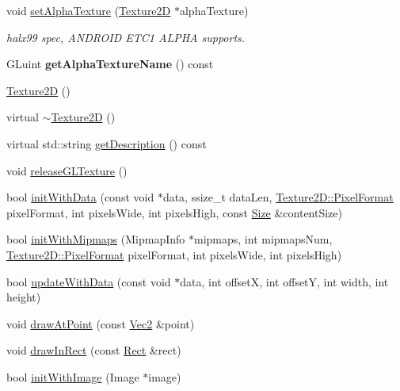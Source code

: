 \begin{DoxyCompactItemize}
void \hyperlink{classTexture2D_a40d47bff7f05c1ef11a7a6a40ad0578c}{set\+Alpha\+Texture} (\hyperlink{classTexture2D}{Texture2D} $\ast$alpha\+Texture)
\begin{DoxyCompactList}\small\item\em halx99 spec, A\+N\+D\+R\+O\+ID E\+T\+C1 A\+L\+P\+HA supports. \end{DoxyCompactList}\item 
\mbox{\label{classTexture2D_adccfd52496163de8b3e62e7ed041ae60}} 
G\+Luint {\bfseries get\+Alpha\+Texture\+Name} () const
\item 
\hyperlink{classTexture2D_ab62c7c5172a4800b4629cd475147819d}{Texture2D} ()
\item 
virtual \hyperlink{classTexture2D_a7871eee8e1b6621b4fb15cc767778459}{$\sim$\+Texture2D} ()
\item 
virtual std\+::string \hyperlink{classTexture2D_aa2c1fc6c5eb4f22fff53abb9a03b1dea}{get\+Description} () const
\item 
void \hyperlink{classTexture2D_ae9edf32b4f3dc4841e09a2b1835fc08c}{release\+G\+L\+Texture} ()
\item 
bool \hyperlink{classTexture2D_a7e0c3fb5fc89625c4943dba0cba3b444}{init\+With\+Data} (const void $\ast$data, ssize\+\_\+t data\+Len, \hyperlink{classTexture2D_a45d9d8bb5a0669def36bbdfbfb91d220}{Texture2\+D\+::\+Pixel\+Format} pixel\+Format, int pixels\+Wide, int pixels\+High, const \hyperlink{classSize}{Size} \&content\+Size)
\item 
bool \hyperlink{classTexture2D_ae57b9e38403f115d0959308ec653a8b0}{init\+With\+Mipmaps} (Mipmap\+Info $\ast$mipmaps, int mipmaps\+Num, \hyperlink{classTexture2D_a45d9d8bb5a0669def36bbdfbfb91d220}{Texture2\+D\+::\+Pixel\+Format} pixel\+Format, int pixels\+Wide, int pixels\+High)
\item 
bool \hyperlink{classTexture2D_a06d6b7b456d0211776628f67e686f1bc}{update\+With\+Data} (const void $\ast$data, int offsetX, int offsetY, int width, int height)
\item 
void \hyperlink{classTexture2D_a58fcaf9540bdeac3b4858d0c3eaa5b97}{draw\+At\+Point} (const \hyperlink{classVec2}{Vec2} \&point)
\item 
void \hyperlink{classTexture2D_aaacff4a0ff5d60af71daa090f6e35654}{draw\+In\+Rect} (const \hyperlink{classRect}{Rect} \&rect)
\item 
bool \hyperlink{classTexture2D_a1ae4992389059e5f78785e28d28d53be}{init\+With\+Image} (Image $\ast$image)
\item 

\end{DoxyCompactItemize}
